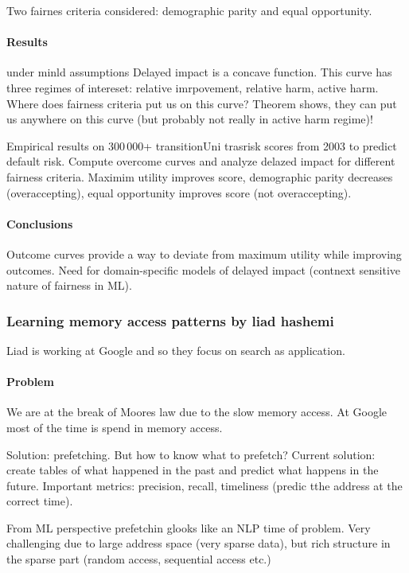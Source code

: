 \documentclass[11pt,oneside,a4paper]{scrartcl}
\begin{document}
Two fairnes criteria considered: demographic parity and equal
opportunity.

\paragraph{Results}
under minld assumptions Delayed impact is a concave function. This
curve has three regimes of intereset: relative imrpovement, relative
harm, active harm. Where does fairness criteria put us on this curve?
Theorem shows, they can put us anywhere on this curve (but probably
not really in active harm regime)!

Empirical results on 300\,000+ transitionUni trasrisk scores from 2003
to predict default risk.  Compute overcome curves and analyze delazed
impact for different fairness criteria.  Maximim utility improves
score, demographic parity decreases (overaccepting), equal opportunity
improves score (not overaccepting).

\paragraph{Conclusions}
Outcome curves provide a way to deviate from maximum utility while
improving outcomes. Need for domain-specific models of delayed
impact (contnext sensitive nature of fairness in ML).

\subsubsection{Learning memory access patterns by liad hashemi \cite{hashemi18a}}
\label{sec:learn-memr-access}

Liad is working at Google and so they focus on search as application.

\paragraph{Problem}
We are at the break of Moores law due to the slow memory access.
At Google most of the time is spend in memory access.

Solution: prefetching. But how to know what to prefetch? Current
solution: create tables of what happened in the past and predict what
happens in the future. Important metrics: precision, recall,
timeliness (predic tthe address at the correct time).

From ML perspective prefetchin glooks like an NLP time of
problem. Very challenging due to large address space (very sparse
data), but rich structure in the sparse part (random access,
sequential access etc.)
\end{document}
